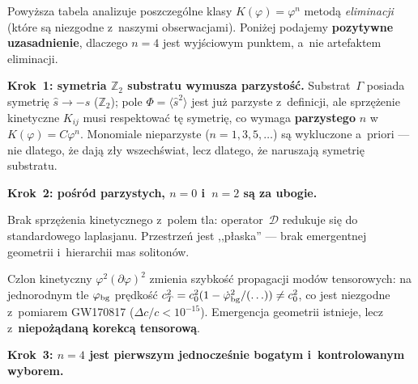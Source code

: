 \begin{remark}[Zasada minimalnej nieliniowo\'sci: dlaczego $K(\varphi) = \varphi^4$]%
\label{rem:minimal-nonlinearity}
Powy\.zsza tabela analizuje poszczeg\'olne klasy $K(\varphi) = \varphi^n$ metod\k{a}
\emph{eliminacji} (kt\'ore s\k{a} niezgodne z~naszymi obserwacjami).
Poni\.zej podajemy \textbf{pozytywne uzasadnienie}, dlaczego $n = 4$
jest wyj\'sciowym punktem, a~nie artefaktem eliminacji.

\medskip\noindent
\textbf{Krok~1: symetria $\mathbb{Z}_2$ substratu wymusza parzysto\'s\'c.}
Substrat~$\Gamma$ posiada symetri\k{e} $\hat{s} \to -\hat{s}$ ($\mathbb{Z}_2$);
pole $\Phi = \langle\hat{s}^2\rangle$ jest ju\.z parzyste z~definicji,
ale sprz\k{e}\.zenie kinetyczne $K_{ij}$ musi respektowa\'c t\k{e} symetri\k{e},
co wymaga \textbf{parzystego} $n$ w~$K(\varphi) = C\varphi^n$.
Monomiale nieparzyste ($n = 1, 3, 5, \ldots$) s\k{a} wykluczone a~priori ---
nie dlatego, \.ze daj\k{a} z\l{}y wszech\'swiat, lecz dlatego, \.ze naruszaj\k{a}
symetri\k{e} substratu.

\medskip\noindent
\textbf{Krok~2: po\'sr\'od parzystych, $n = 0$ i~$n = 2$ s\k{a} za ubogie.}

\begin{description}[nosep,style=nextline]
  \item[$n = 0$\ ($K = \mathrm{const}$)]
    Brak sprz\k{e}\.zenia kinetycznego z~polem tla: operator~$\mathcal{D}$
    redukuje si\k{e} do standardowego laplasjanu.
    Przestrze\'n jest ,,p\l{}aska'' --- brak emergentnej geometrii
    i~hierarchii mas soliton\'ow.
  \item[$n = 2$\ ($K = \varphi^2$,\ $\alpha = 1$)]
    Czlon kinetyczny $\varphi^2(\partial\varphi)^2$ zmienia szybko\'s\'c
    propagacji mod\'ow tensorowych: na jednorodnym tle $\varphi_{\rm bg}$
    pr\k{e}dko\'s\'c $c_T^2 = c_0^2(1 - \dot\varphi_{\rm bg}^2/(\ldots)) \neq c_0^2$,
    co jest niezgodne z~pomiarem GW170817 ($\Delta c/c < 10^{-15}$).
    Emergencja geometrii istnieje, lecz z~\textbf{niepo\.z\k{a}dan\k{a}
    korekc\k{a} tensorow\k{a}}.
\end{description}

\medskip\noindent
\textbf{Krok~3: $n = 4$ jest pierwszym jednocze\'snie bogatym i~kontrolowanym wyborem.}


\end{remark}
